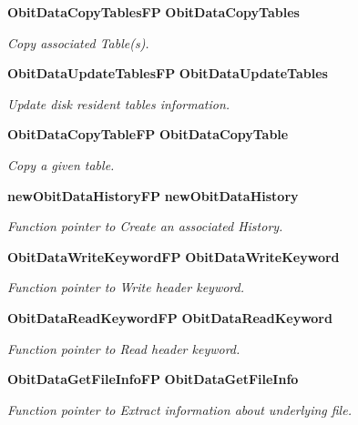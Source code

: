 \begin{CompactItemize}
{\bf Obit\-Data\-Copy\-Tables\-FP} {\bf Obit\-Data\-Copy\-Tables}
\begin{CompactList}\small\item\em Copy associated Table(s). \item\end{CompactList}\item 
{\bf Obit\-Data\-Update\-Tables\-FP} {\bf Obit\-Data\-Update\-Tables}
\begin{CompactList}\small\item\em Update disk resident tables information. \item\end{CompactList}\item 
{\bf Obit\-Data\-Copy\-Table\-FP} {\bf Obit\-Data\-Copy\-Table}
\begin{CompactList}\small\item\em Copy a given table. \item\end{CompactList}\item 
{\bf new\-Obit\-Data\-History\-FP} {\bf new\-Obit\-Data\-History}
\begin{CompactList}\small\item\em Function pointer to Create an associated History. \item\end{CompactList}\item 
{\bf Obit\-Data\-Write\-Keyword\-FP} {\bf Obit\-Data\-Write\-Keyword}
\begin{CompactList}\small\item\em Function pointer to Write header keyword. \item\end{CompactList}\item 
{\bf Obit\-Data\-Read\-Keyword\-FP} {\bf Obit\-Data\-Read\-Keyword}
\begin{CompactList}\small\item\em Function pointer to Read header keyword. \item\end{CompactList}\item 
{\bf Obit\-Data\-Get\-File\-Info\-FP} {\bf Obit\-Data\-Get\-File\-Info}
\begin{CompactList}\small\item\em Function pointer to Extract information about underlying file. \item\end{CompactList}\end{CompactItemize}


